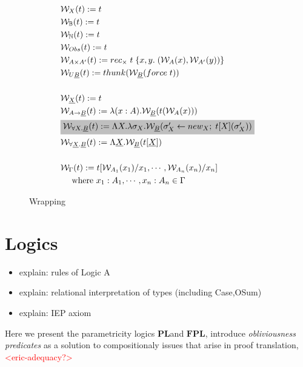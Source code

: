 \documentclass[acmsmall]{acmart}
\newcommand{\eric}[1]{\textcolor{red}{ <eric-#1> }}
\newcommand{\pl}{$\mathbf{PL}$}
\newcommand{\fpl}{$\mathbf{FPL}$}
\begin{document}
\begin{figure}[H]
  \centering
  \scriptsize
  \begin{align*}
  &\mathcal{W} _X(t) := t\\
  &\mathcal{W} _\mathbb{B}(t) := t\\
  &\mathcal{W} _\mathbb{N}(t) := t\\
  &\mathcal{W} _{Obs}(t) := t\\
  &\mathcal{W} _{A \times A'}(t) := rec_\times \;t\;\{x,y.\; (\mathcal{W} _A(x),\mathcal{W} _{A'}(y))\}\\
  &\mathcal{W}_{U\underline{B}}(t) := thunk(\mathcal{W} _{\underline{B}}(force\;t))\\
  \\
  &\mathcal{W}_{\underline{X}}(t) := t\\
  &\mathcal{W} _{A \rightarrow \underline{B}}(t) := \lambda(x:A).\mathcal{W}_{\underline{B}}(t(\mathcal{W}_A(x)))\\
  &\colorbox{lightgray}{$\mathcal{W}_{\forall X.\underline{B}}(t) := 
  \Lambda X.\lambda \sigma_X.  \mathcal{W}_{\underline{B}}(\sigma_X'\leftarrow new_X;\;t[X](\sigma_X'))$}\\
  &\mathcal{W}_{\forall \underline{X}.\underline{B}}(t) := 
  \Lambda \underline{X}.\mathcal{W}_{\underline{B}}(t[\underline{X}])\\
  \\
  &\mathcal{W}_\Gamma(t) := t[\mathcal{W}_{A_1}(x_1)/x_1,\cdots,\mathcal{W}_{A_n}(x_n)/x_n] \\
  &\quad \text{ where } x_1:A_1,\cdots,x_n:A_n \in \Gamma
\end{align*}

\caption{Wrapping}
\label{fig:wrapping}
\end{figure}
  


\section{Logics}\label{sec:Logics}
\begin{itemize}
  \item explain: rules of Logic A
  \item explain: relational interpretation of types (including Case,OSum)
  \item explain: IEP axiom
\end{itemize}
Here we present the parametricity logics \pl\;and \fpl, introduce \textit{obliviousness predicates} as a solution to compositionaly issues that arise in proof translation, \eric{adequacy?}
\end{document}
